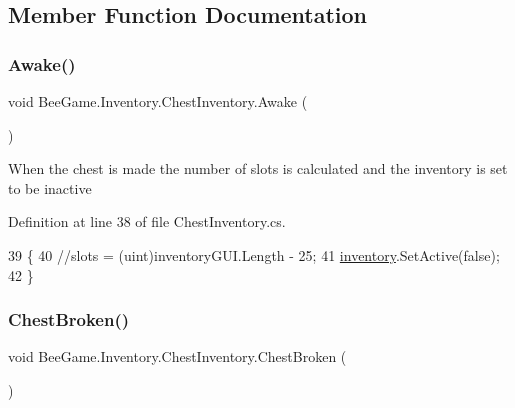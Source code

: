 \subsection{Member Function Documentation}
\mbox{\label{class_bee_game_1_1_inventory_1_1_chest_inventory_aa1ba251e8466684dc8a16b53afadbf90}} 
\subsubsection{\texorpdfstring{Awake()}{Awake()}}
{\footnotesize\ttfamily void Bee\+Game.\+Inventory.\+Chest\+Inventory.\+Awake (\begin{DoxyParamCaption}{ }\end{DoxyParamCaption})\hspace{0.3cm}{\ttfamily [private]}}



When the chest is made the number of slots is calculated and the inventory is set to be inactive 



Definition at line 38 of file Chest\+Inventory.\+cs.


\begin{DoxyCode}
39         \{
40             \textcolor{comment}{//slots = (uint)inventoryGUI.Length - 25;}
41             \hyperlink{class_bee_game_1_1_inventory_1_1_chest_inventory_ac6fe8eed65557a7eb99e56d201c55466}{inventory}.SetActive(\textcolor{keyword}{false});
42         \}
\end{DoxyCode}
\mbox{\label{class_bee_game_1_1_inventory_1_1_chest_inventory_a9d38ab66a63c4d54bbba631e267a7149}} 
\subsubsection{\texorpdfstring{Chest\+Broken()}{ChestBroken()}}
{\footnotesize\ttfamily void Bee\+Game.\+Inventory.\+Chest\+Inventory.\+Chest\+Broken (\begin{DoxyParamCaption}{ }\end{DoxyParamCaption})}





